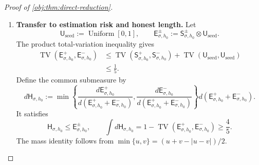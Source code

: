 \begin{proof}[Proof of \cref{obj:thm:direct-reduction}]
\begin{enumerate}
For a sample
\[
\mathbf s=((x_i,d_i,y_i))_{i=1}^n
\in(\mathbb R\times\{0,1\}^2)^n,
\]
define the common Gaussian observation kernel by
\[
\mathsf K_{\sigma,n}(\mathbf s,\mathsf F)
:=
\Pr\!\left\{
((x_i+\sigma\varepsilon_i,d_i,y_i))_{i=1}^n
\in\mathsf F
\right\},
\qquad
(\varepsilon_i)_{i=1}^n\sim N(0,1)^{\otimes n}.
\]
The Gaussian variables in this definition are independent of the input sample. Gaussian error independence under the direct laws implies
\[
\mathsf S_{\sigma,h_0}^{\pm}
=\mathsf K_{\sigma,n}\mathsf S_{0,h_0}^{\pm}.
\]
For every measurable output event \(\mathsf F\), the function
\(\mathsf K_{\sigma,n}(\cdot,\mathsf F)\) takes values in \([0,1]\). The layer-cake formula therefore bounds the difference of its integrals by
\[
\begin{aligned}
&\left|
\int\mathsf K_{\sigma,n}(\mathbf s,\mathsf F)
\,d\mathsf S_{0,h_0}^+(\mathbf s)
-
\int\mathsf K_{\sigma,n}(\mathbf s,\mathsf F)
\,d\mathsf S_{0,h_0}^-(\mathbf s)
\right|\\
&\qquad\le
\int_0^1
\left|
\mathsf S_{0,h_0}^+
\{\mathsf K_{\sigma,n}(\cdot,\mathsf F)>t\}
-
\mathsf S_{0,h_0}^-
\{\mathsf K_{\sigma,n}(\cdot,\mathsf F)>t\}
\right|\,dt\\
&\qquad\le
\operatorname{TV}(\mathsf S_{0,h_0}^+,\mathsf S_{0,h_0}^-).
\end{aligned}
\]
Taking the supremum over output events proves
\[
\operatorname{TV}(\mathsf S_{\sigma,h_0}^+,\mathsf S_{\sigma,h_0}^-)
\le
\operatorname{TV}(\mathsf S_{0,h_0}^+,\mathsf S_{0,h_0}^-)
\le\frac15.
\]
The construction and this inequality also apply at \(\sigma=0\).

\item \textbf{Transfer to estimation risk and honest length.}
Let
\[
\mathsf U_{\mathrm{seed}}:=\operatorname{Uniform}[0,1],
\qquad
\mathsf E_{\sigma,h_0}^{\pm}
:=\mathsf S_{\sigma,h_0}^{\pm}\otimes\mathsf U_{\mathrm{seed}}.
\]
The product total-variation inequality gives
\[
\begin{aligned}
\operatorname{TV}(\mathsf E_{\sigma,h_0}^+,\mathsf E_{\sigma,h_0}^-)
&\le
\operatorname{TV}(\mathsf S_{\sigma,h_0}^+,\mathsf S_{\sigma,h_0}^-)
+\operatorname{TV}(\mathsf U_{\mathrm{seed}},\mathsf U_{\mathrm{seed}})\\
&\le\frac15.
\end{aligned}
\]
Define the common submeasure by
\[
d\mathsf H_{\sigma,h_0}
:=
\min\!\left\{
\frac{d\mathsf E_{\sigma,h_0}^+}
{d(\mathsf E_{\sigma,h_0}^++\mathsf E_{\sigma,h_0}^-)},
\frac{d\mathsf E_{\sigma,h_0}^-}
{d(\mathsf E_{\sigma,h_0}^++\mathsf E_{\sigma,h_0}^-)}
\right\}
d(\mathsf E_{\sigma,h_0}^++\mathsf E_{\sigma,h_0}^-).
\]
It satisfies
\[
\mathsf H_{\sigma,h_0}\le\mathsf E_{\sigma,h_0}^{\pm},
\qquad
\int d\mathsf H_{\sigma,h_0}
=
1-\operatorname{TV}(\mathsf E_{\sigma,h_0}^+,\mathsf E_{\sigma,h_0}^-)
\ge\frac45.
\]
The mass identity follows from
\(\min\{u,v\}=(u+v-|u-v|)/2\).


\end{enumerate}
\end{proof}
